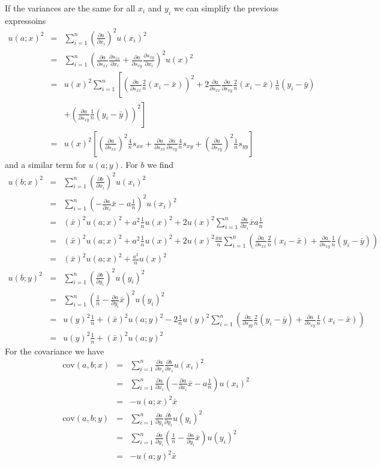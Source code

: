 \documentclass[a4paper,11pt,onepage]{article}
\newcommand{\cov}{\mathrm{cov}}
\newcommand{\ddp}[2]{\frac{\partial #1}{\partial #2}}
\begin{document}
If the variances are the same for all $x_i$ and $y_i$ we can simplify the previous expressoins
\begin{eqnarray*}
 u(a;x)^2 &=& \sum_{i=1}^n \left(\ddp{a}{x_i}\right)^2 u(x_i)^2 \\
 &=& \sum_{i=1}^n \left( \ddp{a}{s_{xx}} \ddp{s_{xx}}{x_i} + \ddp{a}{s_{xy}} \ddp{s_{xy}}{x_i}\right)^2 u(x)^2 \\
 &=& u(x)^2 \sum_{i=1}^n \left[ \left( \ddp{a}{s_{xx}}  \frac2{n} (x_i - \bar x) \right)^2  + \right. 
      2\ddp{a}{s_{xx}} \ddp{a}{s_{xy}} \frac2n (x_i - \bar x ) \frac1n (y_i - \bar y) \\
        && \left.+ \left( \ddp{a}{s_{xy}} \frac1n (y_i - \bar y) \right)^2 
       \right] \\
 &=& u(x) ^2 \left[ \left( \ddp{a}{s_{xx}} \right)^2 \frac4{n} s_{xx} +  \ddp{a}{s_{xx}} \ddp{a}{s_{xy}} \frac4n s_{xy} 
 + \left( \ddp{a}{s_{xy}} \right)^2 \frac1n s_{yy} \right]       
\end{eqnarray*}
and a similar term for $u(a;y)$.
For $b$ we find
\begin{eqnarray*}
 u(b;x)^2 &=& \sum_{i=1}^n \left(\ddp{b}{x_i}\right)^2 u(x_i)^2 \\
 &=& \sum_{i=1}^n \left( - \ddp{a}{x_i} \bar x - a \frac1n \right)^2 u(x_i)^2 \\
 &=& \left(\bar x\right)^2 u(a;x)^2 + a^2 \frac1n u(x)^2 + 2 u(x)^2 \sum_{i=1}^n \ddp{a}{x_i} \bar x a \frac1n \\
 &=& \left(\bar x\right)^2 u(a;x)^2 + a^2 \frac1n u(x)^2 + 2 u(x)^2 \frac{\bar x a}n \sum_{i=1}^n \left(  \ddp{a}{s_{xx}}  \frac2{n} (x_i - \bar x) + \ddp{a}{s_{xy}} \frac1n (y_i - \bar y)\right) \\
 &=& \left(\bar x\right)^2 u(a;x)^2 + \frac{a^2}n u(x)^2 \\
 u(b;y)^2 &=& \sum_{i=1}^n \left(\ddp{b}{y_i}\right)^2 u(y_i)^2 \\
 &=& \sum_{i=1}^n \left(\frac1n - \ddp{a}{y_i} \bar x\right)^2 u(y_i)^2 \\
 &=& u(y)^2 \frac1n + \left(\bar x \right)^2 u(a;y)^2 - 2 \frac1n u(y)^2 \sum_{i=1}^n \left(  \ddp{a}{s_{yy}}  \frac2{n} (y_i - \bar y) + \ddp{a}{s_{xy}} \frac1n (x_i - \bar x)\right) \\ 
 &=& u(y)^2 \frac1n + \left(\bar x \right)^2 u(a;y)^2
\end{eqnarray*}
For the covariance we have
\begin{eqnarray*}
 \cov(a,b;x) &=& \sum_{i=1}^n \ddp{a}{x_i} \ddp{b}{x_i} u(x_i)^2 \\
  &=&  \sum_{i=1}^n \ddp{a}{x_i}\left( - \ddp{a}{x_i} \bar x - a \frac1n \right) u(x_i)^2 \\
  &=& - u(a;x)^2 \bar x \\
 \cov(a,b;y) &=& \sum_{i=1}^n \ddp{a}{y_i} \ddp{b}{y_i} u(y_i)^2 \\
  &=&  \sum_{i=1}^n \ddp{a}{y_i}\left( \frac1n - \ddp{a}{y_i} \bar x \right) u(y_i)^2 \\
  &=& -u(a;y)^2\bar x
\end{eqnarray*}
\end{document}

